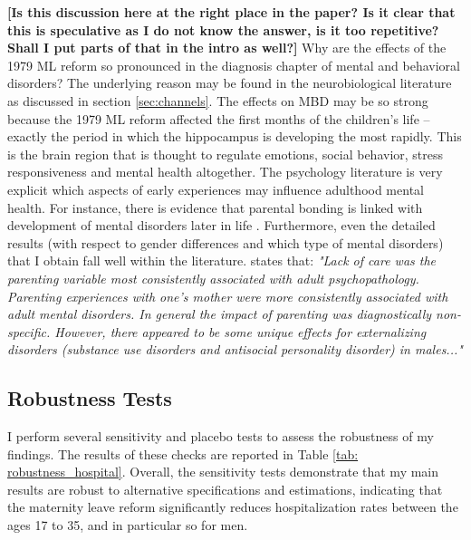 \documentclass[11pt, a4paper]{article} %
\begin{document}
\textbf{[Is this discussion here at the right place in the paper? Is it clear that this is speculative as I do not know the answer, is it too repetitive? Shall I put parts of that in the intro as well?]}\newline
Why are the effects of the 1979 ML reform so pronounced in the diagnosis chapter of mental and behavioral disorders? The underlying reason may be found in the neurobiological literature as discussed in section \ref{sec:channels}. The effects on MBD may be so strong because the 1979 ML reform affected the first months of the children's life -- exactly the period in which the hippocampus is developing the most rapidly. This is the brain region that is thought to regulate emotions, social behavior, stress responsiveness and mental health altogether. The psychology literature is very explicit which aspects of early experiences may influence adulthood mental health. For instance, there is evidence that parental bonding is linked with development of mental disorders later in life \citep{canetti1997parental}. Furthermore, even the detailed results (with respect to gender differences and which type of mental disorders) that I obtain fall well within the literature. \cite{enns_cox_clara_2002} states that: \textit{"Lack of care was the parenting variable most consistently associated with adult psychopathology. Parenting experiences with one’s mother were more consistently associated with
adult mental disorders. In general the impact of parenting was diagnostically non-specific. However,
there appeared to be some unique effects for externalizing disorders (substance use disorders and
antisocial personality disorder) in males..."}







\bigskip
\subsection{Robustness Tests}\label{sec: robustness}

I perform several sensitivity and placebo tests to assess the robustness of my findings. The results of these checks are reported in Table \ref{tab: robustness_hospital}. Overall, the sensitivity tests demonstrate that my main results are robust to alternative specifications and estimations, indicating that the maternity leave reform significantly reduces hospitalization rates between the ages 17 to 35, and in particular so for men.\newline
\end{document}
